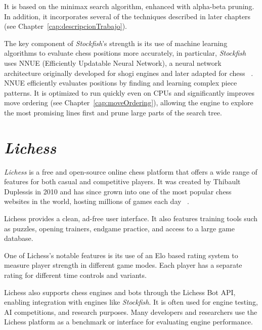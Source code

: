 \vspace{1em}

\par It is based on the minimax search algorithm, enhanced with alpha-beta pruning. In addition, it incorporates several of the techniques described in later chapters (see Chapter~\ref{cap:descripcionTrabajo}).

\vspace{1em}

\par The key component of \textit{Stockfish}'s strength is its use of machine learning algorithms to evaluate chess positions more accurately, in particular, \textit{Stockfish} uses NNUE (Efficiently Updatable Neural Network), a neural network architecture originally developed for shogi engines and later adapted for chess ~\cite{NNUE}. NNUE efficiently evaluates positions by finding and learning complex piece patterns. It is optimized to run quickly even on CPUs and significantly improves move ordering (see Chapter~\ref{cap:moveOrdering}), allowing the engine to explore the most promising lines first and prune large parts of the search tree.

\vspace{1em}

\section{\textit{Lichess}}
\label{sec:lichess}

\textit{Lichess} is a free and open-source online chess platform that offers a wide range of features for both casual and competitive players. It was created by Thibault Duplessis in 2010 and has since grown into one of the most popular chess websites in the world, hosting millions of games each day ~\cite{Lichess}.

\vspace{1em}

\noindent Lichess provides a clean, ad-free user interface. It also features training tools such as puzzles, opening trainers, endgame practice, and access to a large game database.

\vspace{1em}

\noindent One of Lichess's notable features is its use of an Elo based rating system to measure player strength in different game modes. Each player has a separate rating for different time controls and variants.

\vspace{1em}

\noindent Lichess also supports chess engines and bots through the Lichess Bot API, enabling integration with engines like \textit{Stockfish}. It is often used for engine testing, AI competitions, and research purposes. Many developers and researchers use the Lichess platform as a benchmark or interface for evaluating engine performance.
